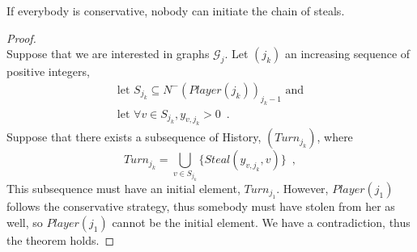    \begin{proofsketch}
       If everybody is conservative, nobody can initiate the chain of steals.
    \end{proofsketch}
    \begin{proof} \ \\
       Suppose that we are interested in graphs $\mathcal{G}_j$. Let $(j_k)$ an increasing sequence of positive integers,
       \begin{equation*}
       \begin{gathered}
          \mbox{let } S_{j_k} \subseteq N^{-}\left(Player\left(j_k\right)\right)_{j_k-1} \mbox{ and} \\
          \mbox{let } \forall v \in S_{j_k}, y_{v, j_k} > 0\enspace.
       \end{gathered}
       \end{equation*}
       Suppose that there exists a subsequence of History, $(Turn_{j_k})$, where
       \begin{equation*}
          Turn_{j_k} = \bigcup\limits_{v \in S_{j_k}}\{Steal(y_{v, j_k},v)\} \enspace,
       \end{equation*}
       This subsequence must have an initial element, $Turn_{j_1}$. However, $Player(j_1)$ follows the conservative strategy,
       thus somebody must have stolen from her as well, so $Player(j_1)$ cannot be the initial element. We have a
       contradiction, thus the theorem holds.
    \end{proof}

